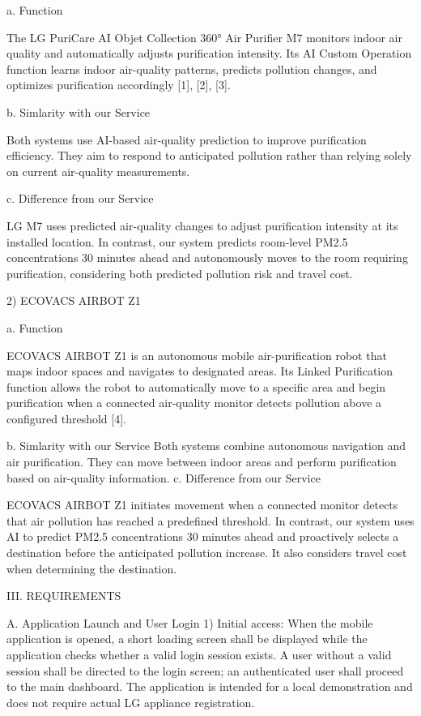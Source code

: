 a. Function

The LG PuriCare AI Objet Collection 360° Air Purifier M7 monitors indoor air quality and automatically adjusts purification intensity. Its AI Custom Operation function learns indoor air-quality patterns, predicts pollution changes, and optimizes purification accordingly [1], [2], [3].

b. Simlarity with our Service

Both systems use AI-based air-quality prediction to improve purification efficiency. They aim to respond to anticipated pollution rather than relying solely on current air-quality measurements.

c. Difference from our Service

LG M7 uses predicted air-quality changes to adjust purification intensity at its installed location. In contrast, our system predicts room-level PM2.5 concentrations 30 minutes ahead and autonomously moves to the room requiring purification, considering both predicted pollution risk and travel cost.

2) ECOVACS AIRBOT Z1

a. Function

ECOVACS AIRBOT Z1 is an autonomous mobile air-purification robot that maps indoor spaces and navigates to designated areas. Its Linked Purification function allows the robot to automatically move to a specific area and begin purification when a connected air-quality monitor detects pollution above a configured threshold [4].

b. Simlarity with our Service
Both systems combine autonomous navigation and air purification. They can move between indoor areas and perform purification based on air-quality information.
c. Difference from our Service

ECOVACS AIRBOT Z1 initiates movement when a connected monitor detects that air pollution has reached a predefined threshold. In contrast, our system uses AI to predict PM2.5 concentrations 30 minutes ahead and proactively selects a destination before the anticipated pollution increase. It also considers travel cost when determining the destination.

III.	REQUIREMENTS

A. Application Launch and User Login
1) Initial access: 
When the mobile application is opened, a short loading screen shall be displayed while the application checks whether a valid login session exists. A user without a valid session shall be directed to the login screen; an authenticated user shall proceed to the main dashboard. The application is intended for a local demonstration and does not require actual LG appliance registration.

